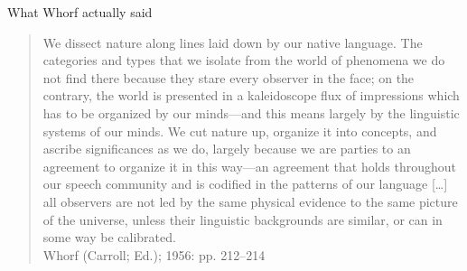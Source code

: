 \begin{frame}{What Whorf actually said}
\begin{quotation}
  We dissect nature along lines laid down by our native language. The
  categories and types that we isolate from the world of phenomena we
  do not find there because they stare every observer in the face; on
  the contrary, the world is presented in a kaleidoscope flux of
  impressions which has to be organized by our minds—and this means
  largely by the linguistic systems of our minds. We cut nature up,
  organize it into concepts, and ascribe significances as we do,
  largely because we are parties to an agreement to organize it in
  this way—an agreement that holds throughout our speech community and
  is codified in the patterns of our language [\ldots] all observers
  are not led by the same physical evidence to the same picture of the
  universe, unless their linguistic backgrounds are similar, or can in
  some way be calibrated.
\\ \hfill Whorf (Carroll; Ed.); 1956: pp. 212–214
\end{quotation}
\end{frame}